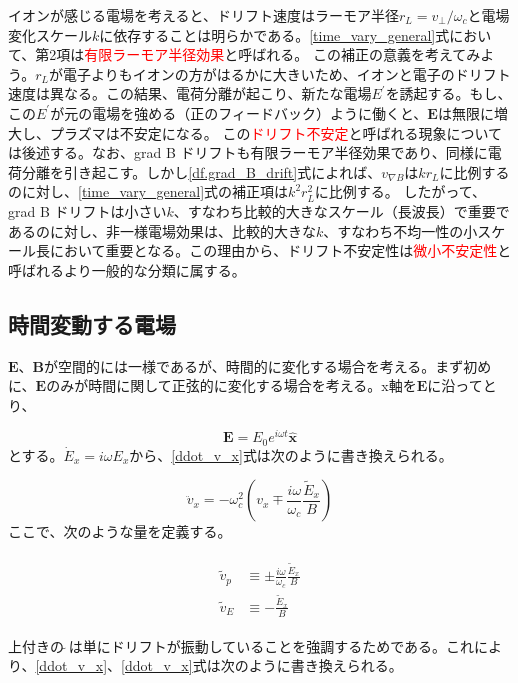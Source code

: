 \documentclass{ltjsarticle}
\numberwithin{equation}{section} %
\begin{document}
イオンが感じる電場を考えると、ドリフト速度はラーモア半径$r_L=v_\perp/\omega_c$と電場変化スケール$k$に依存することは明らかである。\eqref{time_vary_general}式において、第2項は\textcolor{red}{有限ラーモア半径効果}と呼ばれる。 
この補正の意義を考えてみよう。$r_L$が電子よりもイオンの方がはるかに大きいため、イオンと電子のドリフト速度は異なる。この結果、電荷分離が起こり、新たな電場$E^\prime$を誘起する。もし、この$E^\prime$が元の電場を強める（正のフィードバック）ように働くと、$\bm{E}$は無限に増大し、プラズマは不安定になる。
この\textcolor{red}{ドリフト不安定}と呼ばれる現象については後述する。なお、grad B ドリフトも有限ラーモア半径効果であり、同様に電荷分離を引き起こす。しかし\eqref{df.grad_B_drift}式によれば、$v_{\nabla B}$は$kr_L$に比例するのに対し、\eqref{time_vary_general}式の補正項は$k^2r_L^2$に比例する。
したがって、grad B ドリフトは小さい$k$、すなわち比較的大きなスケール（長波長）で重要であるのに対し、非一様電場効果は、比較的大きな$k$、すなわち不均一性の小スケール長において重要となる。この理由から、ドリフト不安定性は\textcolor{red}{微小不安定性}と呼ばれるより一般的な分類に属する。

\subsection{時間変動する電場}
$\bm{E}$、$\bm{B}$が空間的には一様であるが、時間的に変化する場合を考える。まず初めに、$\bm{E}$のみが時間に関して正弦的に変化する場合を考える。x軸を$\bm{E}$に沿ってとり、

\begin{equation}
  \bm{E} = E_0 e^{i\omega t}\hat{\bm{x}}
\end{equation}
とする。$\dot{E}_x = i\omega E_x$から、\eqref{ddot_v_x}式は次のように書き換えられる。

\begin{equation}
  \ddot{v}_x =-\omega_c ^2\left(v_x \mp \frac{i\omega}{\omega_c}\frac{\tilde{E}_x}{B}\right)
\end{equation}
ここで、次のような量を定義する。

\begin{align}
  \begin{split}
    \tilde{v}_p &\equiv \pm \frac{i\omega}{\omega_c}\frac{\tilde{E}_x}{B}\\
    \tilde{v}_E &\equiv -\frac{\tilde{E}_x}{B}  
  \end{split}
\end{align}

上付きの$\, \tilde{}\, $は単にドリフトが振動していることを強調するためである。これにより、\eqref{ddot_v_x}、\eqref{ddot_v_x}式は次のように書き換えられる。
\end{document}
